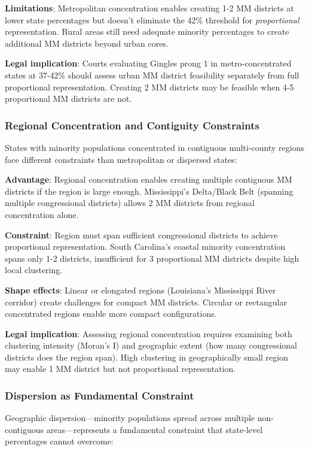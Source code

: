 \textbf{Limitations}: Metropolitan concentration enables creating 1-2 MM districts at lower state percentages but doesn't eliminate the 42\% threshold for \textit{proportional} representation. Rural areas still need adequate minority percentages to create additional MM districts beyond urban cores.

\textbf{Legal implication}: Courts evaluating Gingles prong 1 in metro-concentrated states at 37-42\% should assess urban MM district feasibility separately from full proportional representation. Creating 2 MM districts may be feasible when 4-5 proportional MM districts are not.

\subsubsection{Regional Concentration and Contiguity Constraints}

States with minority populations concentrated in contiguous multi-county regions face different constraints than metropolitan or dispersed states:

\textbf{Advantage}: Regional concentration enables creating multiple contiguous MM districts if the region is large enough. Mississippi's Delta/Black Belt (spanning multiple congressional districts) allows 2 MM districts from regional concentration alone.

\textbf{Constraint}: Region must span sufficient congressional districts to achieve proportional representation. South Carolina's coastal minority concentration spans only 1-2 districts, insufficient for 3 proportional MM districts despite high local clustering.

\textbf{Shape effects}: Linear or elongated regions (Louisiana's Mississippi River corridor) create challenges for compact MM districts. Circular or rectangular concentrated regions enable more compact configurations.

\textbf{Legal implication}: Assessing regional concentration requires examining both clustering intensity (Moran's I) and geographic extent (how many congressional districts does the region span). High clustering in geographically small region may enable 1 MM district but not proportional representation.

\subsubsection{Dispersion as Fundamental Constraint}

Geographic dispersion---minority populations spread across multiple non-contiguous areas---represents a fundamental constraint that state-level percentages cannot overcome:

